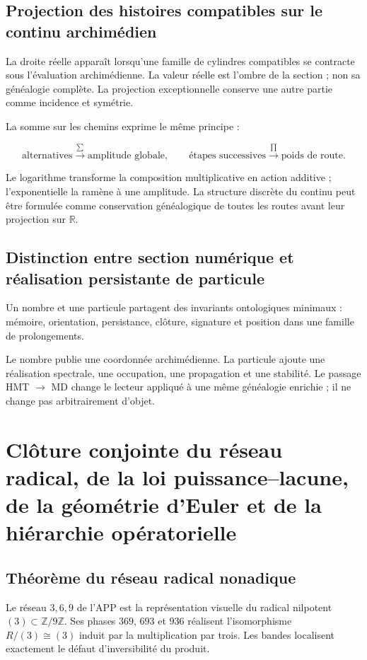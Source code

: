 \subsection{Projection des histoires compatibles sur le continu archimédien}

La droite réelle apparaît lorsqu’une famille de cylindres compatibles se contracte sous l’évaluation archimédienne. La valeur réelle est l’ombre de la section ; non sa généalogie complète. La projection exceptionnelle conserve une autre partie comme incidence et symétrie.

La somme sur les chemins exprime le même principe :

\[
\text{alternatives}\xrightarrow{\sum}\text{amplitude globale},
\qquad
\text{étapes successives}\xrightarrow{\prod}\text{poids de route}.
\]

Le logarithme transforme la composition multiplicative en action additive ; l’exponentielle la ramène à une amplitude. La structure discrète du continu peut être formulée comme conservation généalogique de toutes les routes avant leur projection sur \(\mathbb R\).

\subsection{Distinction entre section numérique et réalisation persistante de particule}

Un nombre et une particule partagent des invariants ontologiques minimaux : mémoire, orientation, persistance, clôture, signature et position dans une famille de prolongements.

Le nombre publie une coordonnée archimédienne. La particule ajoute une réalisation spectrale, une occupation, une propagation et une stabilité. Le passage HMT \(\to\) MD change le lecteur appliqué à une même généalogie enrichie ; il ne change pas arbitrairement d’objet.


\section{Clôture conjointe du réseau radical, de la loi puissance--lacune, de la géométrie d’Euler et de la hiérarchie opératorielle}

\subsection{Théorème du réseau radical nonadique}

Le réseau \(3,6,9\) de l’APP est la représentation visuelle du radical nilpotent \((3)\subset\mathbb Z/9\mathbb Z\). Ses phases \(369\), \(693\) et \(936\) réalisent l’isomorphisme \(R/(3)\cong(3)\) induit par la multiplication par trois. Les bandes localisent exactement le défaut d’inversibilité du produit.

